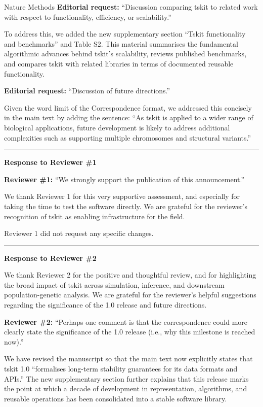 \documentclass{letter}
\begin{document}
\begin{letter}{Nature Methods}
\noindent \textbf{Editorial request:} ``Discussion comparing tskit to related
work with respect to functionality, efficiency, or scalability.''

To address this, we added the new supplementary section ``Tskit functionality
and benchmarks'' and Table S2. This material summarises the fundamental
algorithmic advances behind tskit's scalability, reviews published benchmarks, and
compares tskit with related libraries in terms of documented reusable
functionality.

\noindent \textbf{Editorial request:} ``Discussion of future directions.''

Given the word limit of the Correspondence format, we
addressed this concisely in the main text by adding the sentence: ``As tskit is
applied to a wider range of biological applications, future development is
likely to address additional complexities such as supporting multiple
chromosomes and structural variants.''

\medskip
\hrule
\medskip

\noindent \textbf{Response to Reviewer \#1}

\noindent \textbf{Reviewer \#1:} ``We strongly support the publication of this
announcement.''

We thank Reviewer 1 for this very supportive assessment, and especially for
taking the time to test the software directly. We are grateful for
the reviewer's recognition of tskit as enabling infrastructure for the field.

Reviewer 1 did not request any specific changes.

\medskip
\hrule
\medskip

\noindent \textbf{Response to Reviewer \#2}

We thank Reviewer 2 for the positive and thoughtful review, and for
highlighting the broad impact of tskit across simulation, inference, and
downstream population-genetic analysis. We are grateful for the reviewer’s
helpful suggestions regarding the significance of the 1.0 release and future
directions.

\noindent \textbf{Reviewer \#2:} ``Perhaps one comment is that the
correspondence could more clearly state the significance of the 1.0 release
(i.e., why this milestone is reached now).''

We have revised the manuscript so that the main text now explicitly
states that tskit 1.0 ``formalises long-term stability guarantees for its data
formats and APIs.'' The new supplementary section further explains that this
release marks the point at which a decade of development in representation,
algorithms, and reusable operations has been consolidated into a stable
software library.


\end{letter}
\end{document}

